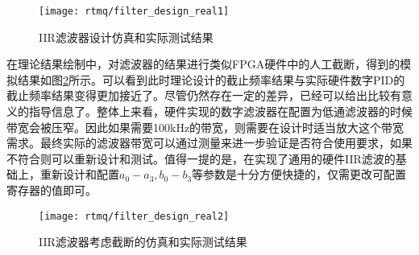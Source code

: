 \begin{figure}
    \centering
    \caption[IIR滤波器设计仿真和实际测试结果]{IIR滤波器设计仿真和实际测试结果\label{fig:filter_design_real1}}
    \texttt{[image: rtmq/filter\_design\_real1]}
\end{figure}

在理论结果绘制中，对滤波器的结果进行类似FPGA硬件中的人工截断，得到的模拟结果如图\ref{fig:filter_design_real2}所示。可以看到此时理论设计的截止频率结果与实际硬件数字PID的截止频率结果变得更加接近了。尽管仍然存在一定的差异，已经可以给出比较有意义的指导信息了。整体上来看，硬件实现的数字滤波器在配置为低通滤波器的时候带宽会被压窄。因此如果需要100kHz的带宽，则需要在设计时适当放大这个带宽需求。最终实际的滤波器带宽可以通过测量来进一步验证是否符合使用要求，如果不符合则可以重新设计和测试。值得一提的是，在实现了通用的硬件IIR滤波的基础上，重新设计和配置$a_0-a_3, b_0-b_3$等参数是十分方便快捷的，仅需更改可配置寄存器的值即可。

\begin{figure}
    \centering
    \caption[IIR滤波器考虑截断的仿真和实际测试结果]{IIR滤波器考虑截断的仿真和实际测试结果\label{fig:filter_design_real2}}
    \texttt{[image: rtmq/filter\_design\_real2]}
\end{figure}

